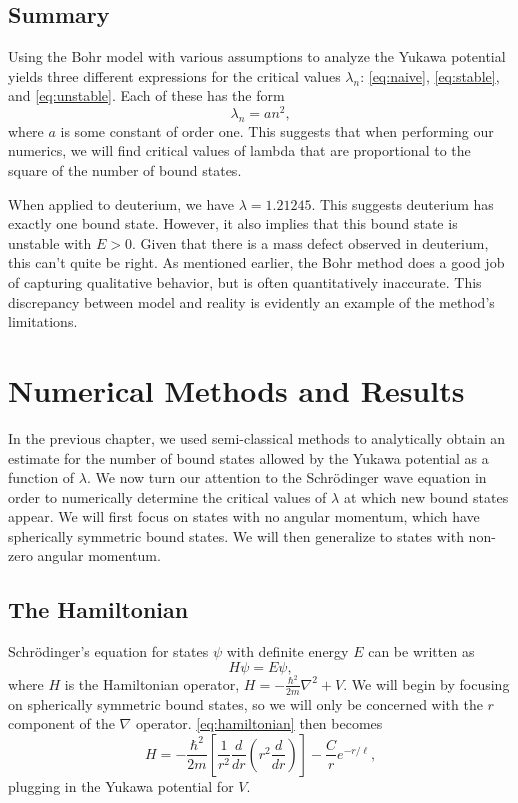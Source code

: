 \documentclass[12pt,twoside]{reedthesis}
\newcommand{\eqn}[1]{\begin{equation}#1\end{equation}}
\begin{document}
\section{Summary}
Using the Bohr model with various assumptions to analyze the Yukawa potential yields three different expressions for the critical values $\lambda_n$: \eqref{eq:naive}, \eqref{eq:stable}, and \eqref{eq:unstable}. Each of these has the form 
\eqn{
\lambda_{n} = a n^2\mbox{,}
}
where $a$ is some constant of order one. This suggests that when performing our numerics, we will find critical values of lambda that are proportional to the square of the number of bound states. 

When applied to deuterium, we have $\lambda = 1.21245$. This suggests deuterium has exactly one bound state. However, it also implies that this bound state is unstable with $E > 0$. Given that there is a mass defect observed in deuterium, this can't quite be right. As mentioned earlier, the Bohr method does a good job of capturing qualitative behavior, but is often quantitatively inaccurate. This discrepancy between model and reality is evidently an example of the method's limitations.

\clearpage %

\chapter{Numerical Methods and Results}

In the previous chapter, we used semi-classical methods to analytically obtain an estimate for the number of bound states allowed by the Yukawa potential as a function of $\lambda$.  We now turn our attention to the Schr\"odinger wave equation in order to numerically determine the critical values of $\lambda$ at which new bound states appear. We will first focus on states with no angular momentum, which have spherically symmetric bound states. We will then generalize to states with non-zero angular momentum.

\section{The Hamiltonian}

Schr\"odinger's equation for states $\psi$ with definite energy $E$ can be written as
\eqn{
H \psi = E\psi\mbox{,}
\label{eq:hamiltonian}
}
where $H$ is the Hamiltonian operator, $H =-\frac{\hbar^2}{2m}\nabla^2 +V$.  We will begin by focusing on spherically symmetric bound states, so we will only be concerned with the $r$ component of the $\nabla$ operator. \eqref{eq:hamiltonian} then becomes
\eqn{
H = -\frac{\hbar^2}{2m} \left[\frac{1}{r^2}\frac{d}{dr}\left(r^2 \frac{d}{dr}\right)\right] - \frac{C}{r}e^{-r/\ell}\mbox{,}
}
plugging in the Yukawa potential for $V$.
\end{document}
